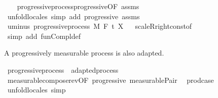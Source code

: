 \begin{isabellebody}
%
\isadelimproof
\ \ %
\endisadelimproof
%
\isatagproof
{}\isamarkupfalse%
\ progressive{\isacharunderscore}{\kern0pt}process{\isachardot}{\kern0pt}progressive{\isacharbrackleft}{\kern0pt}OF\ assms{\isacharbrackright}{\kern0pt}\ \isamarkupfalse%
\ {\isacharparenleft}{\kern0pt}unfold{\isacharunderscore}{\kern0pt}locales{\isacharparenright}{\kern0pt}\ {\isacharparenleft}{\kern0pt}simp\ add{\isacharcolon}{\kern0pt}\ progressive\ assms{\isacharparenright}{\kern0pt}%
\endisatagproof
{\isafoldproof}%
%
\isadelimproof
\isanewline
%
\endisadelimproof
\isanewline
{}\isamarkupfalse%
\ uminus{\isacharcolon}{\kern0pt}\ {\isachardoublequoteopen}progressive{\isacharunderscore}{\kern0pt}process\ M\ F\ t\ {\isacharparenleft}{\kern0pt}{\isacharminus}{\kern0pt}X{\isacharparenright}{\kern0pt}{\isachardoublequoteclose}%
\isadelimproof
\ %
\endisadelimproof
%
\isatagproof
{}\isamarkupfalse%
\ scaleR{\isacharunderscore}{\kern0pt}right{\isacharunderscore}{\kern0pt}const{\isacharbrackleft}{\kern0pt}of\ {\isachardoublequoteopen}{\isasymlambda}{\isacharunderscore}{\kern0pt}{\isachardot}{\kern0pt}\ {\isacharminus}{\kern0pt}{}{\isachardoublequoteclose}{\isacharbrackright}{\kern0pt}\ \isamarkupfalse%
\ {\isacharparenleft}{\kern0pt}simp\ add{\isacharcolon}{\kern0pt}\ fun{\isacharunderscore}{\kern0pt}Compl{\isacharunderscore}{\kern0pt}def{\isacharparenright}{\kern0pt}%
\endisatagproof
{\isafoldproof}%
%
\isadelimproof
%
\endisadelimproof
\isanewline
\isanewline
{}\isamarkupfalse%
%
\begin{isamarkuptext}%
A progressively measurable process is also adapted.%
\end{isamarkuptext}\isamarkuptrue%
\isamarkupfalse%
\ progressive{\isacharunderscore}{\kern0pt}process\ {\isasymsubseteq}\ adapted{\isacharunderscore}{\kern0pt}process%
\isadelimproof
\ %
\endisadelimproof
%
\isatagproof
{}\isamarkupfalse%
\ measurable{\isacharunderscore}{\kern0pt}compose{\isacharunderscore}{\kern0pt}rev{\isacharbrackleft}{\kern0pt}OF\ progressive\ measurable{\isacharunderscore}{\kern0pt}Pair{}{\isacharprime}{\kern0pt}{\isacharbrackright}{\kern0pt}\ \isamarkupfalse%
\ prod{\isachardot}{\kern0pt}case\ \isamarkupfalse%
\ {\isacharparenleft}{\kern0pt}unfold{\isacharunderscore}{\kern0pt}locales{\isacharparenright}{\kern0pt}\ simp%
\endisatagproof
{\isafoldproof}%
%
\isadelimproof
%
\endisadelimproof
\isanewline
\isanewline
{}\isamarkupfalse%

\end{isabellebody}
